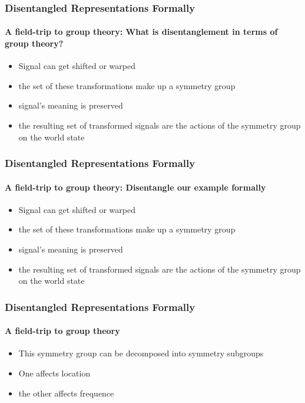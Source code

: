 \documentclass[9pt]{beamer}
\begin{document}
\begin{frame}
\frametitle{Disentangled Representations Formally}
\framesubtitle{A field-trip to group theory: What is disentanglement in terms of group theory?}
\begin{itemize}%
	\item Signal can get shifted or warped
	\item the set of these transformations make up a symmetry group
	\item signal's meaning is preserved
	\item the resulting set of transformed signals are the actions of the symmetry group on the world state
\end{itemize}
\end{frame} 





\begin{frame}
\frametitle{Disentangled Representations Formally}
\framesubtitle{A field-trip to group theory: Disentangle our example formally}
\begin{itemize}%
	\item Signal can get shifted or warped
	\item the set of these transformations make up a symmetry group
	\item signal's meaning is preserved
	\item the resulting set of transformed signals are the actions of the symmetry group on the world state
\end{itemize}
\end{frame} 




\begin{frame}
\frametitle{Disentangled Representations Formally}
\framesubtitle{A field-trip to group theory}
\begin{itemize}%
	\item This symmetry group can be decomposed into symmetry subgroups
	\item One affects location
	\item the other affects frequence
\end{itemize}
\end{frame} 
\end{document}
